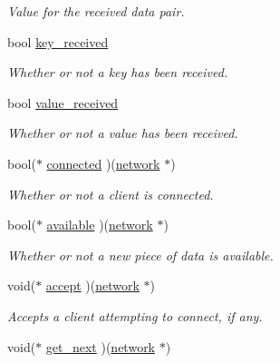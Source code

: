 \begin{DoxyCompactItemize}
\begin{DoxyCompactList}\small\item\em Value for the received data pair. \end{DoxyCompactList}\item 
bool \hyperlink{structnetwork__module_a4784db26a8a7efad337587b17c3528e5}{key\+\_\+received}
\begin{DoxyCompactList}\small\item\em Whether or not a key has been received. \end{DoxyCompactList}\item 
bool \hyperlink{structnetwork__module_a0b70928a73be3f659343f22be8a24f3e}{value\+\_\+received}
\begin{DoxyCompactList}\small\item\em Whether or not a value has been received. \end{DoxyCompactList}\item 
\hypertarget{structnetwork__module_a3e334c1bbb94af2c28a6f9640b71f9f3}{}bool($\ast$ \hyperlink{structnetwork__module_a3e334c1bbb94af2c28a6f9640b71f9f3}{connected} )(\hyperlink{structnetwork__module}{network} $\ast$)\label{structnetwork__module_a3e334c1bbb94af2c28a6f9640b71f9f3}

\begin{DoxyCompactList}\small\item\em Whether or not a client is connected. \end{DoxyCompactList}\item 
\hypertarget{structnetwork__module_ae02e17462647b1ccbfe0e0b32ee8c300}{}bool($\ast$ \hyperlink{structnetwork__module_ae02e17462647b1ccbfe0e0b32ee8c300}{available} )(\hyperlink{structnetwork__module}{network} $\ast$)\label{structnetwork__module_ae02e17462647b1ccbfe0e0b32ee8c300}

\begin{DoxyCompactList}\small\item\em Whether or not a new piece of data is available. \end{DoxyCompactList}\item 
\hypertarget{structnetwork__module_a67ee65e8fda7a67403847ae16ecd50b4}{}void($\ast$ \hyperlink{structnetwork__module_a67ee65e8fda7a67403847ae16ecd50b4}{accept} )(\hyperlink{structnetwork__module}{network} $\ast$)\label{structnetwork__module_a67ee65e8fda7a67403847ae16ecd50b4}

\begin{DoxyCompactList}\small\item\em Accepts a client attempting to connect, if any. \end{DoxyCompactList}\item 
\hypertarget{structnetwork__module_a88126c0e2db37f47180ecca97f14a7ab}{}void($\ast$ \hyperlink{structnetwork__module_a88126c0e2db37f47180ecca97f14a7ab}{get\+\_\+next} )(\hyperlink{structnetwork__module}{network} $\ast$)\label{structnetwork__module_a88126c0e2db37f47180ecca97f14a7ab}


\end{DoxyCompactItemize}

